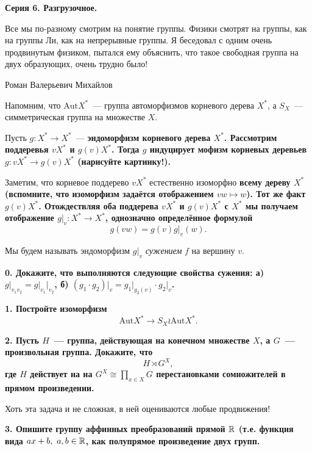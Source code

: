 \documentclass[12pt]{article}
\begin{document}
	\centerline{\bf{Серия 6. Разгрузочное. }}


	\epigraph{Все мы по-разному смотрим на понятие группы. Физики смотрят на группы, как на группы Ли, как на непрерывные группы. Я беседовал с одним очень продвинутым физиком, пытался ему объяснить, что такое свободная группа на двух образующих, очень трудно было!}{Роман Валерьевич Михайлов}

	Напомним, что $\mathrm{Aut}{X^*}$~--- группа автоморфизмов корневого дерева $X^*$, а $S_{X}$~---  симметрическая группа на множестве $X$.

	Пусть $g\colon X^* \to X^*$~--- \bf{эндоморфизм} корневого дерева $X^*$. Рассмотрим поддеревья $v X^*$ и $g(v) X^*$. Тогда $g$ индуцирует мофизм корневых деревьев $g\colon v X^* \to g(v) X^*$ (\bf{нарисуйте картинку!}). 

	Заметим, что корневое поддерево $v X^*$ естественно изоморфно \bf{всему} дереву $X^*$ (вспомните, что изоморфизм задаётся отображением $vw \mapsto w$). Тот же факт $g(v)X^*$. Отождествляя оба поддерева $v X^*$ и $g(v) X^*$ с $X^*$ мы получаем отображение $g\vert_{v} \colon X^* \to X^*$, однозначно определённое формулой 
	\[
		g(vw) = g(v) g\vert_{v}(w).
	\]

	Мы будем называть эндоморфизм $g\vert_{v}$ \emph{сужением} $f$ на вершину $v$.

	\bf{0.} Докажите, что выполняются следующие свойства сужения: а) $g\vert_{v_1 v_2} = g\vert_{v_1}\vert_{v_2}$, б) $(g_1 \cdot g_2)\vert_{v} = g_1\vert_{g_2(v)} \cdot g_2\vert_{v}$. 

	\bf{1.} Постройте изоморфизм 
	\[
		\mathrm{Aut}{X^*} \to S_{X} \wr \mathrm{Aut}{X^*}. 
	\]

	\bf{2.} Пусть $H$~--- группа, действующая на конечном множестве $X$, а $G$~--- произвольная группа. Докажите, что 
	\[
	 	H \rtimes G^X,
	 \] 
	 где $H$ действует на на $G^X \cong \prod_{x \in X} G$ перестановками сомножителей в прямом произведении. 

	 Хоть эта задача и не сложная, в ней оцениваются любые продвижения! 

	 \bf{3.} Опишите группу аффинных преобразований прямой $\mathbb{R}$ (т.е. функция вида $ax + b, \ a, b \in \mathbb{R}$, как полупрямое произведение двух групп. 
	
\end{document}
